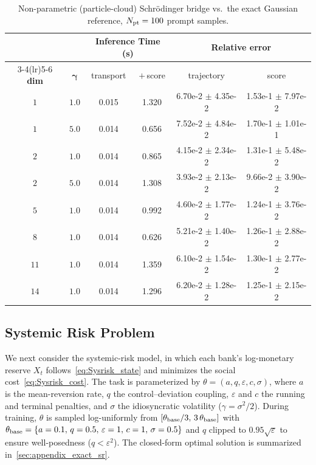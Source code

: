 \documentclass[preprint]{elsarticle}
\newcommand{\g}{\gamma}
\begin{document}
\begin{table}[htpb]
    \centering
    \caption{Non-parametric (particle-cloud) Schr\"odinger bridge vs.\ the exact
    Gaussian reference, $N_{\rm pt}=100$ prompt samples.
    }
    \label{tab:nonparam_sb_error}
    \begin{tabular}{cccccc}
        \toprule
         & & \multicolumn{2}{c}{\textbf{Inference Time (s)}}
            & \multicolumn{2}{c}{\textbf{Relative error}} \\
        \cmidrule(lr){3-4}\cmidrule(lr){5-6}
        \textbf{dim} & $\boldsymbol{\g}$ & transport & $+$\,score
            & trajectory & score \\
        \midrule
        $1$ & $1.0$ & 0.015 & 1.320 & 6.70e-2 $\pm$ 4.35e-2 & 1.53e-1 $\pm$ 7.97e-2 \\
        $1$ & $5.0$ & 0.014 & 0.656 & 7.52e-2 $\pm$ 4.84e-2 & 1.70e-1 $\pm$ 1.01e-1 \\
        \midrule
        $2$ & $1.0$ & 0.014 & 0.865 & 4.15e-2 $\pm$ 2.34e-2 & 1.31e-1 $\pm$ 5.48e-2 \\
        $2$ & $5.0$ & 0.014 & 1.308 & 3.93e-2 $\pm$ 2.13e-2 & 9.66e-2 $\pm$ 3.90e-2 \\
        \midrule
        $5$ & $1.0$ & 0.014 & 0.992 & 4.60e-2 $\pm$ 1.77e-2 & 1.24e-1 $\pm$ 3.76e-2 \\
        $8$ & $1.0$ & 0.014 & 0.626 & 5.21e-2 $\pm$ 1.40e-2 & 1.26e-1 $\pm$ 2.88e-2 \\
        $11$ & $1.0$ & 0.014 & 1.359 & 6.10e-2 $\pm$ 1.54e-2 & 1.30e-1 $\pm$ 2.77e-2 \\
        $14$ & $1.0$ & 0.014 & 1.296 & 6.20e-2 $\pm$ 1.28e-2 & 1.25e-1 $\pm$ 2.15e-2 \\
        \bottomrule
    \end{tabular}
\end{table}

\subsection{Systemic Risk Problem}
\label{sec:exp_sr1}

We next consider the systemic-risk model, in which each bank's log-monetary reserve $X_t$ follows~\eqref{eq:Sysrisk_state} and minimizes the social cost~\eqref{eq:Sysrisk_cost}. The task is parameterized by $\theta=(a,q,\varepsilon,c,\sigma)$, where $a$ is the mean-reversion rate, $q$ the control--deviation coupling, $\varepsilon$ and $c$ the running and terminal penalties, and $\sigma$ the idiosyncratic volatility ($\gamma=\sigma^2/2$). During training, $\theta$ is sampled log-uniformly from $[\theta_{\rm base}/3,\,3\,\theta_{\rm base}]$ with $\theta_{\rm base}=\{a=0.1,\,q=0.5,\,\varepsilon=1,\,c=1,\,\sigma=0.5\}$ and $q$ clipped to $0.95\sqrt{\varepsilon}$ to ensure well-posedness ($q<\varepsilon^2$). The closed-form optimal solution is summarized in~\ref{sec:appendix_exact_sr}.
\end{document}
